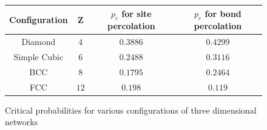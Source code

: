 \begin{figure}[h!]
\begin{center}
\begin{tabular}{| c | c | c | c |}
    \hline
    Configuration & Z & $p_c$ for site percolation & $p_c$ for bond percolation \\
    \hline
    Diamond & $4$ & $0.3886$ & $0.4299$ \\
    Simple Cubic & $6$ & $0.2488$ & $0.3116$ \\
    BCC & $8$ & $0.1795$ & $0.2464$ \\
    FCC & $12$ & $0.198$ & $0.119$ \\
    \hline
  \end{tabular}
\end{center}
\centering
\caption{Critical probabilities for various configurations of three dimensional networks\cite[p. 11]{Sahimi}}
\label{fig:critical probabilities in three dimensions}
\end{figure}

